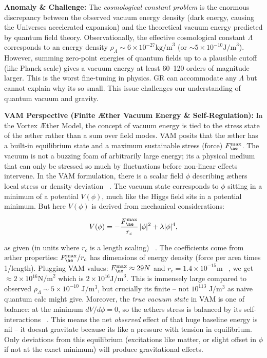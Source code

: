 \documentclass[a4paper, aps,preprint,superscriptaddress, 12pt]{revtex4}
\begin{document}
\textbf{Anomaly \& Challenge: } The \textit{cosmological constant problem} is the enormous discrepancy between the observed vacuum energy density (dark energy, causing the Universe\rqs s accelerated expansion) and the theoretical vacuum energy predicted by quantum field theory. Observationally, the effective cosmological constant $\Lambda$ corresponds to an energy density $\rho_{\Lambda}\sim 6\times10^{-27}\text{kg/m}^3$ (or $\sim 5\times10^{-10}\text{J/m}^3$). However, summing zero-point energies of quantum fields up to a plausible cutoff (like Planck scale) gives a vacuum energy at least 60–120 orders of magnitude larger. This is the worst fine-tuning in physics. GR can accommodate any $\Lambda$ but cannot explain why it\rqs s so small. This issue challenges our understanding of quantum vacuum and gravity.


\textbf{VAM Perspective (Finite Æther Vacuum Energy \& Self-Regulation):} In the Vortex Æther Model, the concept of vacuum energy is tied to the stress state of the æther rather than a sum over field modes. VAM posits that the æther has a built-in equilibrium state and a maximum sustainable stress (force) $F_{\ae}^{\max}$. The vacuum is not a buzzing foam of arbitrarily large energy; it\rqs s a physical medium that can only be stressed so much by fluctuations before non-linear effects intervene. In the VAM formulation, there is a scalar field $\phi$ describing æther\rqs s local stress or density deviation~\cite{Iskandarani2025c} . The vacuum state corresponds to $\phi$ sitting in a minimum of a potential $V(\phi)$, much like the Higgs field sits in a potential minimum. But here $V(\phi)$ is derived from mechanical considerations:

\begin{equation}
    V(\phi) = -\frac{F_{\ae}^{\max}}{r_c}\,|\phi|^2 + \lambda |\phi|^4,
\end{equation}

as given (in units where $r_c$ is a length scaling)~\cite{Iskandarani2025c} . The coefficients come from æther properties: $F_{\ae}^{\max}/r_c$ has dimensions of energy density (force per area times 1/length). Plugging VAM values: $F_{\ae}^{\max}\approx 29N$ and $r_c=1.4\times10^{-15}\text{m}$~\cite{VAM_constants} , we get $\approx 2\times10^{16}\text{N/m}^2$ which is $2\times10^{16}\text{J/m}^3$. This is immensely large compared to observed $\rho_\Lambda\sim5\times10^{-10}$ J/m$^3$, but crucially it\rqs s finite – not $10^{113}$ J/m$^3$ as naive quantum calc might give. Moreover, the \textit{true vacuum state} in VAM is one of balance: at the minimum $dV/d\phi=0$, so the æther\rqs s stress is balanced by its self-interactions~\cite{Iskandarani2025c} . This means the net \textit{observed} effect of that huge baseline energy is nil – it doesn\rqs t gravitate because it\rqs s like a pressure with tension in equilibrium. Only deviations from this equilibrium (excitations like matter, or slight offset in $\phi$ if not at the exact minimum) will produce gravitational effects.
\end{document}
